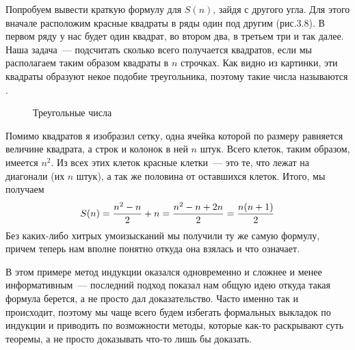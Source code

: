 Попробуем вывести краткую формулу для $S(n)$, зайдя с другого угла. Для этого вначале расположим красные квадраты в ряды один под другим (рис.3.8). В первом ряду у нас будет один квадрат, во втором два, в третьем три и так далее. Наша задача~--- подсчитать сколько всего получается квадратов, если мы располагаем таким образом квадраты в $n$ строчках. Как видно из картинки, эти квадраты образуют некое подобие треугольника, поэтому такие числа называются .

\begin{figure}[h]
\centering
{}
\caption{Треугольные числа}
\end{figure}

Помимо квадратов я изобразил сетку, одна ячейка которой по размеру равняется величине квадрата, а строк и колонок в ней $n$ штук. Всего клеток, таким образом, имеется $n^2$. Из всех этих клеток красные клетки~--- это те, что лежат на диагонали (их $n$ штук), а так же половина от оставшихся клеток. Итого, мы получаем
$$S(n) = {n^2 - n\over 2} + n = {n^2 - n + 2n \over 2} = {n(n+1)\over 2}$$
Без каких-либо хитрых умоизысканий мы получили ту же самую формулу, причем теперь нам вполне понятно откуда она взялась и что означает.

В этом примере метод индукции оказался одновременно и сложнее и менее информативным~--- последний подход показал нам общую идею откуда такая формула берется, а не просто дал доказательство. Часто именно так и происходит, поэтому мы чаще всего будем избегать формальных выкладок по индукции и приводить по возможности методы, которые как-то раскрывают суть теоремы, а не просто доказывать что-то лишь бы доказать.

